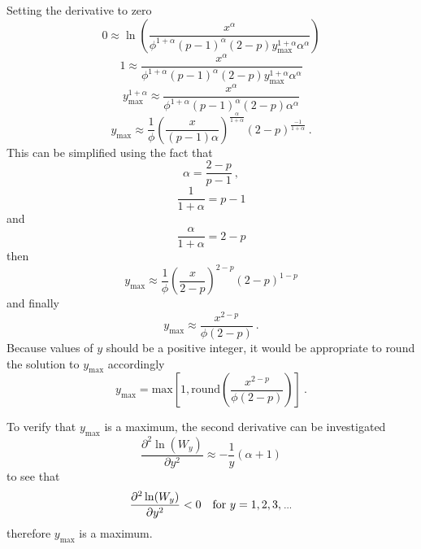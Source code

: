 Setting the derivative to zero
\begin{equation*}
	0 \approx \ln\left(
		\frac{
			x^\alpha
		}
		{
			\phi^{1+\alpha}(p-1)^\alpha(2-p)y_{\text{max}}^{1+\alpha}\alpha^\alpha
		}
	\right)
\end{equation*}
\begin{equation*}
	1 \approx 
	\frac{x^\alpha}{\phi^{1+\alpha}(p-1)^\alpha(2-p)y_{\text{max}}^{1+\alpha}\alpha^\alpha}
\end{equation*}
\begin{equation*}
	y_{\text{max}}^{1+\alpha} \approx 
	\frac{x^\alpha}{\phi^{1+\alpha}(p-1)^\alpha(2-p)\alpha^\alpha}
\end{equation*}
\begin{equation*}
	y_{\text{max}} \approx 
	\frac{1}{\phi}
	\left(
		\frac{x}{(p-1)\alpha}
	\right)^{\frac{\alpha}{1+\alpha}}
	(2-p)^{\frac{-1}{1+\alpha}}
	\ .
\end{equation*}
This can be simplified using the fact that 
\begin{equation*}
	\alpha=\frac{2-p}{p-1}
	\ ,
\end{equation*}
\begin{equation*}
	\frac{1}{1+\alpha} = p-1
\end{equation*}
and
\begin{equation*}
	\frac{\alpha}{1+\alpha} = 2-p
\end{equation*}
then
\begin{equation*}
	y_{\text{max}} \approx 
	\frac{1}{\phi}
	\left(
		\frac{x}{2-p}
	\right)^{2-p}
	(2-p)^{1-p}
\end{equation*}
and finally
\begin{equation}
	y_{\text{max}} \approx \frac{x^{2-p}}{\phi(2-p)}
	\ .
\end{equation}
Because values of $y$ should be a positive integer, it would be appropriate to round the solution to $y_\text{max}$ accordingly
\begin{equation}
	y_{\text{max}} = \text{max}\left[
		1,\text{round}\left(\frac{x^{2-p}}{\phi(2-p)}\right)
	\right]
	\ .
\end{equation}

To verify that $y_\text{max}$ is a maximum, the second derivative can be investigated
\begin{equation}
	\frac{\partial^2\ln(W_y)}{\partial y^2}
	\approx
	-\frac{1}{y}(\alpha+1)
\end{equation}
to see that
\begin{equation}
	\frac{\partial^2\ln(W_y)}{\partial y^2} < 0 \quad \text{for }y=1,2,3,\dotdotdot
\end{equation}
therefore $y_\text{max}$ is a maximum.


